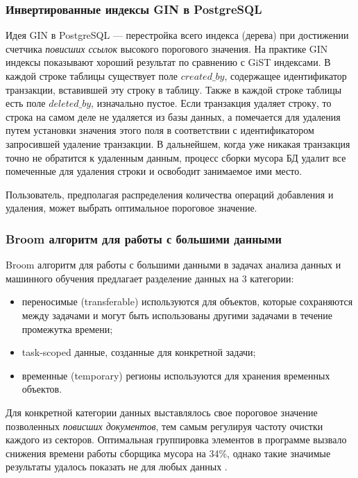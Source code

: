 \subsubsection{Инвертированные индексы GIN в PostgreSQL}

Идея GIN\cite{GIN:2020} в PostgreSQL — перестройка всего индекса (дерева) при достижении счетчика 
\textit{повисших ссылок} высокого порогового значения. На практике GIN индексы
показывают хороший результат по сравнению с GiST индексами. В каждой строке таблицы
существует поле $created\_by$, содержащее идентификатор транзакции, вставившей эту
строку в таблицу. Также в каждой строке таблицы есть поле $deleted\_by$, изначально
пустое. Если транзакция удаляет строку, то строка на самом деле не удаляется из базы
данных, а помечается для удаления путем установки значения этого поля в соответствии
с идентификатором запросившей удаление транзакции. В дальнейшем, когда уже никакая
транзакция точно не обратится к удаленным данным, процесс сборки мусора БД удалит
все помеченные для удаления строки и освободит занимаемое ими место.

Пользователь, предполагая распределения количества операций добавления и удаления,
может выбрать оптимальное пороговое значение.

\subsubsection{Broom алгоритм для работы с большими данными}

Broom алгоритм для работы с большими данными в задачах анализа данных и машинного обучения
предлагает разделение данных на 3 категории:
\begin{itemize}
    \item переносимые (transferable) используются для объектов, которые сохраняются между
    задачами и могут быть использованы другими задачами в течение промежутка времени;
    \item task-scoped данные, созданные для конкретной задачи;
    \item временные (temporary) регионы используются для хранения временных объектов.
\end{itemize}

Для конкретной категории данных выставлялось свое пороговое значение позволенных
\textit{повисших документов}, тем самым регулируя частоту очистки каждого из секторов.
Оптимальная группировка элементов в программе вызвало снижения времени работы сборщика
мусора на 34\%, однако такие значимые результаты удалось показать не для любых данных
\cite{BigData:2018}.

